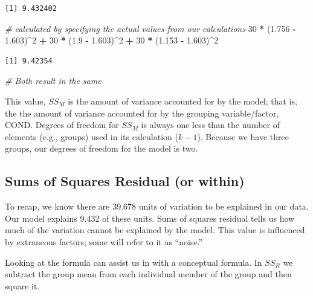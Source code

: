 \documentclass[
  11pt,
]{book}
\newenvironment{Shaded}{\begin{snugshade}}{\end{snugshade}}
\newcommand{\CommentTok}[1]{\textcolor[rgb]{0.37,0.37,0.37}{\textit{#1}}}
\newcommand{\DecValTok}[1]{\textcolor[rgb]{0.06,0.06,0.06}{#1}}
\newcommand{\FloatTok}[1]{\textcolor[rgb]{0.06,0.06,0.06}{#1}}
\newcommand{\NormalTok}[1]{#1}
\newcommand{\SpecialCharTok}[1]{\textcolor[rgb]{0.43,0.43,0.43}{\textbf{#1}}}
\begin{document}
\begin{verbatim}
[1] 9.432402
\end{verbatim}

\begin{Shaded}
\begin{Highlighting}[]
\CommentTok{\# calculated by specifying the actual values from our calculations}
\DecValTok{30} \SpecialCharTok{*}\NormalTok{ (}\FloatTok{1.756} \SpecialCharTok{{-}} \FloatTok{1.603}\NormalTok{)}\SpecialCharTok{\^{}}\DecValTok{2} \SpecialCharTok{+} \DecValTok{30} \SpecialCharTok{*}\NormalTok{ (}\FloatTok{1.9} \SpecialCharTok{{-}} \FloatTok{1.603}\NormalTok{)}\SpecialCharTok{\^{}}\DecValTok{2} \SpecialCharTok{+} \DecValTok{30} \SpecialCharTok{*}\NormalTok{ (}\FloatTok{1.153} \SpecialCharTok{{-}} \FloatTok{1.603}\NormalTok{)}\SpecialCharTok{\^{}}\DecValTok{2}
\end{Highlighting}
\end{Shaded}

\begin{verbatim}
[1] 9.42354
\end{verbatim}

\begin{Shaded}
\begin{Highlighting}[]
\CommentTok{\# Both result in the same}
\end{Highlighting}
\end{Shaded}

This value, \(SS_M\) is the amount of variance accounted for by the model; that is, the the amount of variance accounted for by the grouping variable/factor, COND. Degrees of freedom for \(SS_M\) is always one less than the number of elements (e.g., groups) used in its calculation (\(k-1\)). Because we have three groups, our degrees of freedom for the model is two.

\hypertarget{sums-of-squares-residual-or-within}{%
\subsection{Sums of Squares Residual (or within)}\label{sums-of-squares-residual-or-within}}

To recap, we know there are 39.678 units of variation to be explained in our data. Our model explains 9.432 of these units. Sums of squares residual tells us how much of the variation cannot be explained by the model. This value is influenced by extraneous factors; some will refer to it as ``noise.''

Looking at the formula can assist us in with a conceptual formula. In \(SS_R\) we subtract the group mean from each individual member of the group and then square it.
\end{document}
